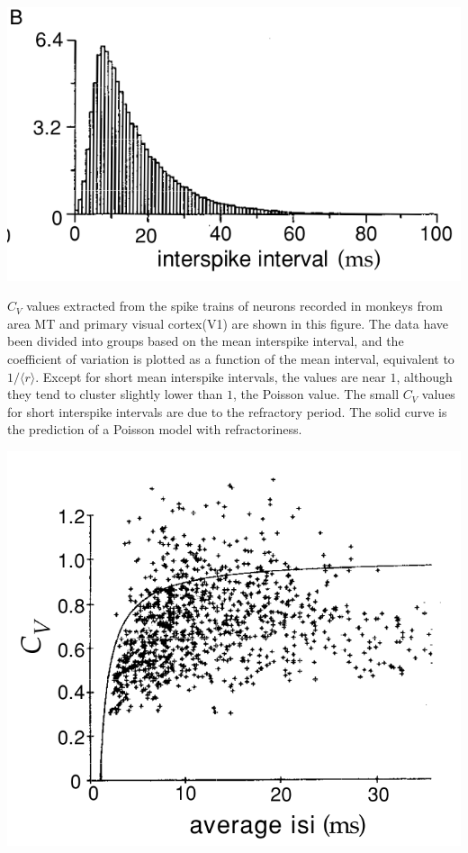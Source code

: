 \begin{center}
    \label{fig:1.15B}    
    \includegraphics[trim=10 10 30 30,clip,scale = 0.36]{png/Figure1-15-B.png}\\    
\end{center}

\begin{exm}
    $C_V$ values extracted from the spike trains of neurons recorded in monkeys from area MT and primary visual cortex(V1) are shown in this figure. The data have been divided into groups based on the mean interspike interval,  and the coefficient of variation is plotted as a function of the mean interval,  equivalent to $1/\langle r\rangle$. Except for short mean interspike intervals, the values are near $1$, although they tend to cluster slightly lower than $1$, the Poisson value. The small $C_V$ values for short interspike intervals are due to the refractory period. The solid curve is the prediction of a Poisson  model with refractoriness.
\end{exm}

\begin{center}
    \label{fig:1.16}    
    \includegraphics[scale = 0.36]{png/Figure1-16.png}\\
\end{center}

